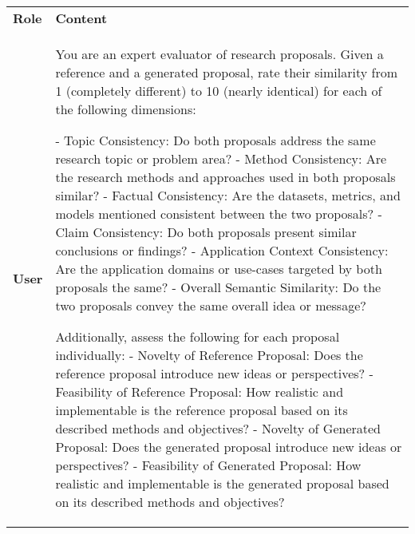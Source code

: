 \begin{table*}[ht]
\centering
\footnotesize
\renewcommand{\arraystretch}{1.3}
\begin{tabular}{p{1cm}p{11.5cm}}
\toprule[1.5pt]
\textbf{Role} & \textbf{Content} \\ 
\cmidrule[0.5pt](lr){1-2}
\textbf{User} & You are an expert evaluator of research proposals. Given a reference and a generated proposal, rate their similarity from 1 (completely different) to 10 (nearly identical) for each of the following dimensions:\newline

- Topic Consistency: Do both proposals address the same research topic or problem area?\newline
- Method Consistency: Are the research methods and approaches used in both proposals similar?\newline
- Factual Consistency: Are the datasets, metrics, and models mentioned consistent between the two proposals?\newline
- Claim Consistency: Do both proposals present similar conclusions or findings?\newline
- Application Context Consistency: Are the application domains or use-cases targeted by both proposals the same?\newline
- Overall Semantic Similarity: Do the two proposals convey the same overall idea or message?\newline

Additionally, assess the following for each proposal individually:\newline
- Novelty of Reference Proposal: Does the reference proposal introduce new ideas or perspectives?\newline
- Feasibility of Reference Proposal: How realistic and implementable is the reference proposal based on its described methods and objectives?\newline
- Novelty of Generated Proposal: Does the generated proposal introduce new ideas or perspectives?\newline
- Feasibility of Generated Proposal: How realistic and implementable is the generated proposal based on its described methods and objectives?\newline


\end{tabular}
\end{table*}
